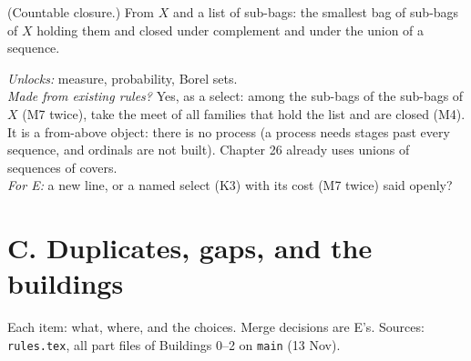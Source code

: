 \begin{lines}
\item[\lab{X3}] (Countable closure.) From $X$ and a list of sub-bags: the smallest bag of sub-bags of $X$ holding them and closed under complement and under the union of a sequence.
\end{lines}
\emph{Unlocks:} measure, probability, Borel sets. \\
\emph{Made from existing rules?} Yes, as a select: among the sub-bags of the sub-bags of $X$ (M7 twice), take the meet of all families that hold the list and are closed (M4). It is a from-above object: there is no process (a process needs stages past every sequence, and ordinals are not built). Chapter 26 already uses unions of sequences of covers. \\
\emph{For E:} a new line, or a named select (K3) with its cost (M7 twice) said openly?

\section*{C. Duplicates, gaps, and the buildings}

Each item: what, where, and the choices. Merge decisions are E's. Sources: \texttt{rules.tex}, all part files of Buildings 0--2 on \texttt{main} (13 Nov).

